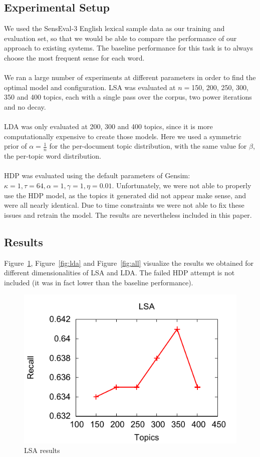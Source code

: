 \subsection{Experimental Setup}
We used the SensEval-3 English lexical sample data as our training and evaluation set, so that we would be able to compare the performance of our approach to existing systems. The baseline performance for this task is to always choose the most frequent sense for each word.\\\\
We ran a large number of experiments at different parameters in order to find the optimal model and configuration. LSA was evaluated at $n=$150, 200, 250, 300, 350 and 400 topics, each with a single pass over the corpus, two power iterations and no decay.\\\\
LDA was only evaluated at 200, 300 and 400 topics, since it is more computationally expensive to create those models. Here we used a symmetric prior of $\alpha = \frac{1}{n}$ for the per-document topic distribution, with the same value for $\beta$, the per-topic word distribution.\\\\
HDP was evaluated using the default parameters of Gensim: $\kappa = 1, \tau = 64, \alpha =1, \gamma =1, \eta =0.01$. Unfortunately, we were not able to properly use the HDP model, as the topics it generated did not appear make sense, and were all nearly identical. Due to time constraints we were not able to fix these issues and retrain the model. The results are nevertheless included in this paper.\\

\subsection{Results}
Figure~\ref{fig:lsa}, Figure~\ref{fig:lda} and Figure~\ref{fig:all} visualize the results we obtained for different dimensionalities of LSA and LDA. The failed HDP attempt is not included (it was in fact lower than the baseline performance). \\
\begin{figure}
   \includegraphics{plot/lsa_lines.pdf}
  \caption{LSA results}
  \label{fig:lsa}
\end{figure}

